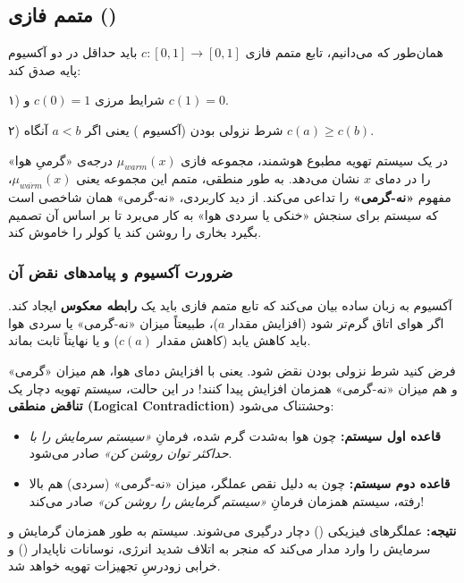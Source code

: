 \documentclass{article}
\begin{document}
\subsection{متمم فازی ()}

همان‌طور که می‌دانیم، تابع متمم فازی $c : [0, 1] \rightarrow [0, 1]$ باید حداقل در دو آکسیوم پایه صدق کند:
 
۱) شرایط مرزی $c(0)=1$ و $c(1)=0$.

۲) شرط نزولی بودن (آکسیوم ) یعنی اگر $a < b$ آنگاه $c(a) \ge c(b)$.

\begin{tcolorbox}[
	colback=lightmutedblue,
	colframe=mutedblue,
	title=تحلیل مفهوم $\mu_{\overline{warm}}(x)$,
	attach boxed title to top right={yshift=-2mm, xshift=-5mm},
	boxed title style={colback=mutedblue, rounded corners}
	]
	در یک سیستم تهویه مطبوع هوشمند، مجموعه فازی $\mu_{warm}(x)$ درجه‌ی «گرمیِ هوا» را در دمای $x$ نشان می‌دهد. به طور منطقی، متمم این مجموعه یعنی $\mu_{\overline{warm}}(x)$، مفهوم \textbf{«نه-گرمی»} را تداعی می‌کند. از دید کاربردی، «نه-گرمی» همان شاخصی است که سیستم برای سنجش «خنکی یا سردی هوا» به کار می‌برد تا بر اساس آن تصمیم بگیرد بخاری را روشن کند یا کولر را خاموش کند.
\end{tcolorbox}

\subsubsection*{ضرورت آکسیوم  و پیامدهای نقض آن}
آکسیوم  به زبان ساده بیان می‌کند که تابع متمم فازی باید یک \textbf{رابطه معکوس} ایجاد کند. اگر هوای اتاق گرم‌تر شود (افزایش مقدار $a$)، طبیعتاً میزان «نه-گرمی» یا سردی هوا باید کاهش یابد (کاهش مقدار $c(a)$) و یا نهایتاً ثابت بماند. 

\begin{tcolorbox}[
	colback=lightmutedorange,
	colframe=mutedorange,
	title=فاجعه در تصمیم‌گیری سیستم صورت نقض آکسیوم \lr{c2},
	coltitle=white
	]
	فرض کنید شرط نزولی بودن نقض شود. یعنی با افزایش دمای هوا، هم میزان «گرمی» و هم میزان «نه-گرمی» همزمان افزایش پیدا کنند! در این حالت، سیستم تهویه دچار یک \textbf{تناقض منطقی (Logical Contradiction)} وحشتناک می‌شود:
	\begin{itemize}
		\item \textbf{قاعده اول سیستم:} چون هوا به‌شدت گرم شده، فرمانِ \textit{«سیستم سرمایش را با حداکثر توان روشن کن»} صادر می‌شود.
		\item \textbf{قاعده دوم سیستم:} چون به دلیل نقص عملگر، میزان «نه-گرمی» (سردی) هم بالا رفته، سیستم همزمان فرمانِ \textit{«سیستم گرمایش را روشن کن»} صادر می‌کند!
	\end{itemize}
	\textbf{نتیجه:} عملگرهای فیزیکی () دچار درگیری می‌شوند. سیستم به طور همزمان گرمایش و سرمایش را وارد مدار می‌کند که منجر به اتلاف شدید انرژی، نوسانات ناپایدار () و خرابی زودرسِ تجهیزات تهویه خواهد شد.
\end{tcolorbox}
\end{document}
